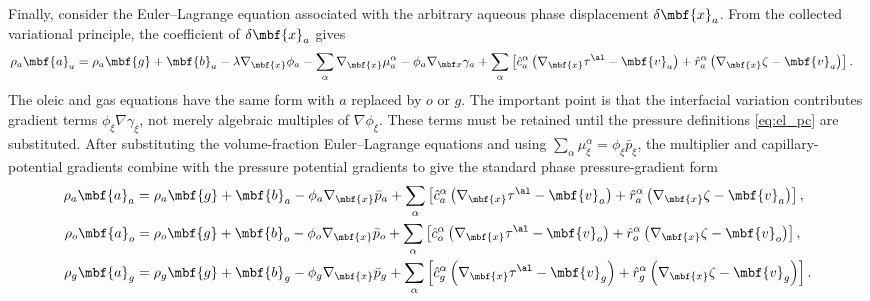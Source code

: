 Finally, consider the Euler--Lagrange equation associated with the arbitrary
aqueous phase displacement $\delta\mbf{x}_a$.  From the collected variational
principle, the coefficient of $\delta\mbf{x}_a$ gives
\begin{align}
  \rho_a\mbf{a}_a
  &= \rho_a\mbf{g} + \mbf{b}_a
  - \lambda\nabla_{\mbf{x}}\phi_a
  - \sum_\alpha\nabla_{\mbf{x}}\mu_a^\alpha
  -\phi_a\nabla_{\mbf x}\gamma_a
  + \sum_\alpha \left[\hat{c}_a^{\alpha}\left(\nabla_{\mbf{x}}\tau^\al - \mbf{v}_a\right)
    + \hat r_a^{\alpha}\left(\nabla_{\mbf{x}}\zeta - \mbf{v}_a\right)\right].
  \label{eq:el_mom_a_start}
\end{align}
The oleic and gas equations have the same form with $a$ replaced by $o$ or $g$.
The important point is that the interfacial variation contributes gradient terms
$\phi_\xi\nabla\gamma_\xi$, not merely algebraic multiples of
$\nabla\phi_\xi$.  These terms must be retained until the pressure definitions
\eqref{eq:el_pc} are substituted.  After substituting the volume-fraction
Euler--Lagrange equations and using $\sum_\alpha\mu_\xi^\alpha=\phi_\xi\bar p_\xi$,
the multiplier and capillary-potential gradients combine with the pressure
potential gradients to give the standard phase pressure-gradient form
\begin{align}
  \rho_a\mbf{a}_a
  &= \rho_a\mbf{g} + \mbf{b}_a
  - \phi_a\nabla_{\mbf{x}}\bar p_a
  + \sum_\alpha \left[\hat{c}_a^{\alpha}\left(\nabla_{\mbf{x}}\tau^\al - \mbf{v}_a\right)
    + \hat r_a^{\alpha}\left(\nabla_{\mbf{x}}\zeta - \mbf{v}_a\right)\right],
  \label{eq:el_mom_a_simplified} \\
  \rho_o\mbf{a}_o
  &= \rho_o\mbf{g} + \mbf{b}_o
  - \phi_o\nabla_{\mbf{x}}\bar p_o
  + \sum_\alpha \left[\hat{c}_o^{\alpha}\left(\nabla_{\mbf{x}}\tau^\al - \mbf{v}_o\right)
    + \hat r_o^{\alpha}\left(\nabla_{\mbf{x}}\zeta - \mbf{v}_o\right)\right],
  \label{eq:el_mom_o_simplified} \\
  \rho_g\mbf{a}_g
  &= \rho_g\mbf{g} + \mbf{b}_g
  - \phi_g\nabla_{\mbf{x}}\bar p_g
  + \sum_\alpha \left[\hat{c}_g^{\alpha}\left(\nabla_{\mbf{x}}\tau^\al - \mbf{v}_g\right)
    + \hat r_g^{\alpha}\left(\nabla_{\mbf{x}}\zeta - \mbf{v}_g\right)\right].
  \label{eq:el_mom_g_simplified}
\end{align}


